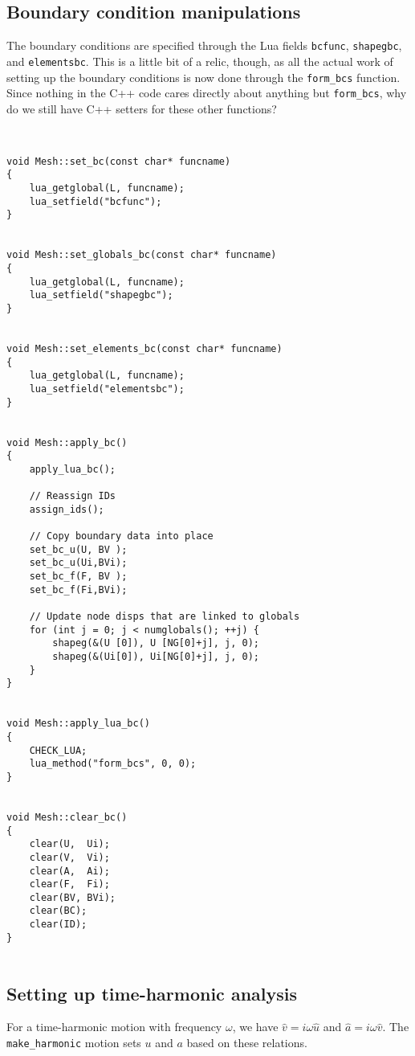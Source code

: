 \subsection{Boundary condition manipulations}

The boundary conditions are specified through the Lua fields 
{\tt bcfunc}, {\tt shapegbc}, and {\tt elementsbc}.  This is a little
bit of a relic, though, as all the actual work of setting up the
boundary conditions is now done through the {\tt form\_bcs}
function.  Since nothing in the C++ code cares directly about
anything but {\tt form\_bcs}, why do we still have C++ setters for
these other functions?

\begin{verbatim}


void Mesh::set_bc(const char* funcname)
{
    lua_getglobal(L, funcname);
    lua_setfield("bcfunc");
}


void Mesh::set_globals_bc(const char* funcname)
{
    lua_getglobal(L, funcname);
    lua_setfield("shapegbc");
}


void Mesh::set_elements_bc(const char* funcname)
{
    lua_getglobal(L, funcname);
    lua_setfield("elementsbc");
}


void Mesh::apply_bc()
{
    apply_lua_bc();

    // Reassign IDs
    assign_ids();

    // Copy boundary data into place
    set_bc_u(U, BV );
    set_bc_u(Ui,BVi);
    set_bc_f(F, BV );
    set_bc_f(Fi,BVi);

    // Update node disps that are linked to globals
    for (int j = 0; j < numglobals(); ++j) {
        shapeg(&(U [0]), U [NG[0]+j], j, 0);
        shapeg(&(Ui[0]), Ui[NG[0]+j], j, 0);
    }
}


void Mesh::apply_lua_bc()
{
    CHECK_LUA;
    lua_method("form_bcs", 0, 0);
}


void Mesh::clear_bc()
{
    clear(U,  Ui);
    clear(V,  Vi);
    clear(A,  Ai);
    clear(F,  Fi);
    clear(BV, BVi);
    clear(BC);
    clear(ID);
}


\end{verbatim}
\subsection{Setting up time-harmonic analysis}

For a time-harmonic motion with frequency $\omega$, we have
$\hat{v} = i \omega \hat{u}$ and $\hat{a} = i \omega \hat{v}$.
The {\tt make\_harmonic} motion sets $u$ and $a$ based on these
relations.

